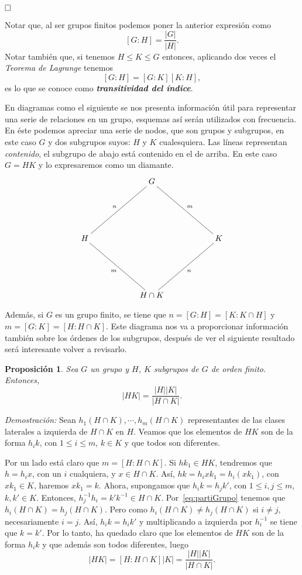 \documentclass[12pt]{article}
\newtheorem{proposition}[theorem]{Proposición}
\begin{document}
$\hfill \square$

Notar que, al ser grupos finitos podemos poner la anterior expresión como $$[G:H] = \dfrac{|G|}{|H|}.$$
Notar también que, si tenemos $H \leq K \leq G$ entonces, aplicando dos veces el \textit{Teorema de Lagrange} tenemos $$[G:H]=[G:K][K:H],$$ es lo que se conoce como \textbf{\textit{transitividad del índice}}.

En diagramas como el siguiente se nos presenta información útil para representar una serie de relaciones en un grupo, esquemas así serán utilizados con frecuencia. En éste podemos apreciar una serie de nodos, que son grupos y subgrupos, en este caso $G$ y dos subgrupos suyos: $H$ y $K$ cualesquiera. Las líneas representan \textit{contenido}, el subgrupo de abajo está contenido en el de arriba. En este caso $G=HK$ y lo expresaremos como un diamante. 
$$\xymatrix @=2cm {&G \ar@{-}[ld]_n \ar@{-}[rd]^m  \\ H \ar@{-}[rd]_m & & K \ar@{-}[ld]^n \\ &H \cap K }$$

Además, si $G$ es un grupo finito, se tiene que $n= [G:H] = [K: K \cap H]$ y $m= [G:K] = [H : H \cap K]$. Este diagrama nos va a proporcionar información también sobre los órdenes de los subgrupos, después de ver el siguiente resultado será interesante volver a revisarlo.

\begin{proposition} Sea $G$ un grupo y $H$, $K$ subgrupos de $G$ de orden finito. Entonces, $$|HK| = \dfrac{|H||K|}{|H \cap K|}.$$
\end{proposition}
\emph{Demostración: } Sean $h_{1}(H \cap K), \cdots, h_{m}(H \cap K)$ representantes de las clases laterales a izquierda de $H\cap K$ en $H$. Veamos que los elementos de $HK$ son de la forma $h_{i}k$, con $1 \leq i \leq m$, $k \in K$ y que todos son diferentes.

Por un lado está claro que $m = [H : H \cap K ]$. Si $hk_1 \in HK$, tendremos que $h = h_{i}x$, con un $i$ cualquiera, y $x \in H \cap K$. Así, $hk = h_{i}xk_1 = h_{i}(xk_1)$, con $xk_1 \in K$, haremos $xk_1 = k$. Ahora, supongamos que $h_{i}k =h_{j}k'$, con $1 \leq i,j \leq m$, $k, k' \in K$. Entonces, $h_{j}^{-1}h_{i} = k'k^{-1} \in H \cap K$. Por~\ref{eq:partiGrupo} tenemos que $h_i(H \cap K) = h_j(H \cap K)$. Pero como $h_{i}(H \cap K) \neq h_{j}(H \cap K)$ si $i \neq j$, necesariamente $i =j$. Así, $h_{i}k =h_{i}k'$ y multiplicando a izquierda por $h_{i}^{-1}$ se tiene que $k = k'$. Por lo tanto, ha quedado claro que los elementos de $HK$ son de la forma $h_{i}k$ y que además son todos diferentes, luego $$|HK| = [H : H\cap K]|K| = \dfrac{|H||K|}{|H \cap K|}.$$
\end{document}
